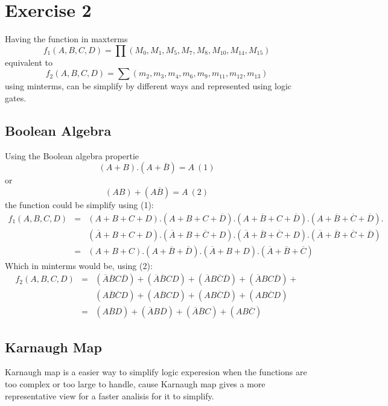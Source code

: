 \documentclass[12pt]{article} %
\begin{document}
    \section{Exercise 2} %
    
    Having the function in maxterms $$f_1 (A,B,C,D) = \prod\left(M_0, M_1 , M_5 , M_7 , M_8 , M_{10} , M_{14} , M_{15} \right)$$ equivalent to $$f_2 (A,B,C,D) = \sum\left(m_2, m_3 , m_4 , m_6 , m_9 , m_{11} , m_{12} , m_{13} \right)$$ using minterms, can be simplify by different ways and represented using logic gates.

    \subsection{Boolean Algebra}

    Using the Boolean algebra propertie $$(A+B).(A+\overline{B})=A~(1)$$ or $$(AB)+(A\overline{B})=A~(2)$$ the function could be simplify using (1): 
    \begin{eqnarray*}
        f_1 (A,B,C,D) &= &(A+B+C+D).(A+B+C+\overline{D}).(A+\overline{B}+C+\overline{D}).(A+\overline{B}+\overline{C}+\overline{D}).\\
        &&(\overline{A}+B+C+D).(\overline{A}+B+\overline{C}+D).(\overline{A}+\overline{B}+\overline{C}+D).(\overline{A}+\overline{B}+\overline{C}+\overline{D}) \\
        &=&(A+B+C).(A+\overline{B}+\overline{D}).(\overline{A}+B+D).(\overline{A}+\overline{B}+\overline{C})
    \end{eqnarray*}
    Which in minterms would be, using (2):
    \begin{eqnarray*}
        f_2(A,B,C,D) &= &(\overline{A}\overline{B}C\overline{D})+(\overline{A}\overline{B}CD)+(\overline{A}B\overline{C}\overline{D})+(\overline{A}BC\overline{D})+\\
        &&(A\overline{B}\overline{C}D)+(A\overline{B}CD)+(AB\overline{C}\overline{D})+(AB\overline{C}D)\\
        &=&(A\overline{B}D)+(\overline{A}B\overline{D})+(\overline{A}\overline{B}C)+(AB\overline{C})
    \end{eqnarray*}

    \subsection{Karnaugh Map}

    Karnaugh map is a easier way to simplify logic experesion when the functions are too complex or too large to handle, cause Karnaugh map gives a more representative view for a faster analisis for it to simplify. 
\end{document}
